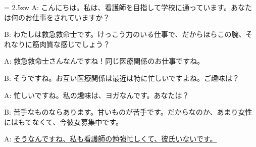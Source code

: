\documentclass[11pt]{amsart}
\title{}
\author{}
\newenvironment{hangall}[1]{\hangindent = 2.5zw\everypar{\hangindent = 2.5zw}}{}
\begin{document}
\maketitle
\begin{hangall}{}%
A: こんにちは。私は、看護師を目指して学校に通っています。あなたは何のお仕事をされていますか？

B: わたしは救急救命士です。けっこう力のいる仕事で、だからほらこの腕、それなりに筋肉質な感じでしょう？

A: 救急救命士さんなんですね！同じ医療関係のお仕事ですね。

B: そうですね。お互い医療関係は最近は特に忙しいですよね。ご趣味は？

A: 忙しいですね。私の趣味は、ヨガなんです。あなたは？

B: 苦手なものならあります。甘いものが苦手です。だからなのか、あまり女性にはもてなくて、今彼女募集中です。

A: \ul{そうなんですね、私も看護師の勉強忙しくて、彼氏いないです。}\end{hangall}
\end{document}
